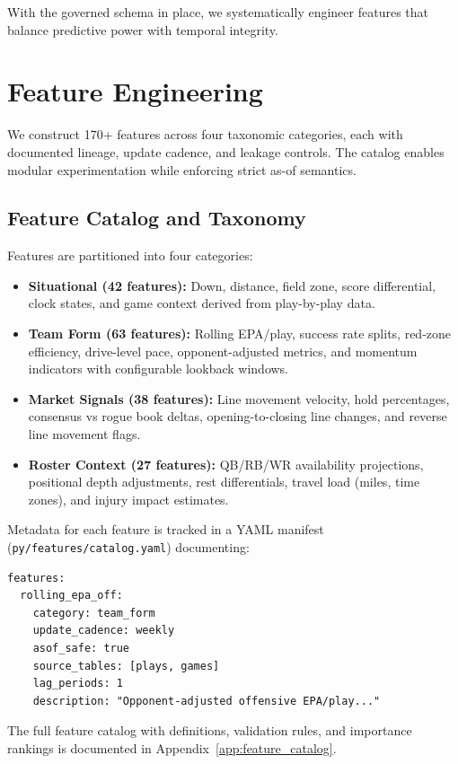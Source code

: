 With the governed schema in place, we systematically engineer features that balance predictive power with temporal integrity.

\section{Feature Engineering}
\label{sec:feature-engineering}

We construct 170+ features across four taxonomic categories, each with documented lineage, update cadence, and leakage controls. The catalog enables modular experimentation while enforcing strict as-of semantics.

\subsection{Feature Catalog and Taxonomy}
\label{subsec:feature-catalog}

Features are partitioned into four categories:
\begin{itemize}
  \item \textbf{Situational (42 features):} Down, distance, field zone, score differential, clock states, and game context derived from play-by-play data.
  \item \textbf{Team Form (63 features):} Rolling EPA/play, success rate splits, red-zone efficiency, drive-level pace, opponent-adjusted metrics, and momentum indicators with configurable lookback windows.
  \item \textbf{Market Signals (38 features):} Line movement velocity, hold percentages, consensus vs rogue book deltas, opening-to-closing line changes, and reverse line movement flags.
  \item \textbf{Roster Context (27 features):} QB/RB/WR availability projections, positional depth adjustments, rest differentials, travel load (miles, time zones), and injury impact estimates.
\end{itemize}

Metadata for each feature is tracked in a YAML manifest (\texttt{py/features/catalog.yaml}) documenting:
\begin{lstlisting}[basicstyle=\ttfamily\scriptsize]
features:
  rolling_epa_off:
    category: team_form
    update_cadence: weekly
    asof_safe: true
    source_tables: [plays, games]
    lag_periods: 1
    description: "Opponent-adjusted offensive EPA/play..."
\end{lstlisting}

The full feature catalog with definitions, validation rules, and importance rankings is documented in Appendix~\ref{app:feature_catalog}.

